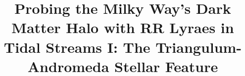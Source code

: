 %
%
%
%




%
%

\title{Probing the Milky Way's Dark Matter Halo with RR Lyraes in Tidal Streams I: The Triangulum-Andromeda Stellar Feature}

%
%
%

\begin{PI}
\end{PI}

\begin{CoI}
\end{CoI}

\begin{CoI}
\end{CoI}

